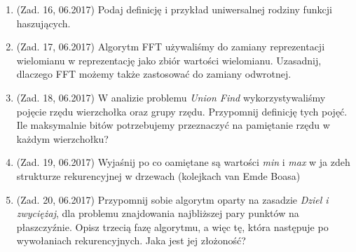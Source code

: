 \documentclass[10pt]{article}%
\begin{document}
\begin{enumerate}
\item (Zad. 16, 06.2017) Podaj definicję i przykład uniwersalnej rodziny funkcji haszujących.

\item (Zad. 17, 06.2017) Algorytm FFT używaliśmy do zamiany reprezentacji wielomianu w reprezentację jako zbiór wartości wielomianu. Uzasadnij, dlaczego FFT możemy także zastosować do zamiany odwrotnej.

\item (Zad. 18, 06.2017) W analizie problemu \emph{Union Find} wykorzystywaliśmy pojęcie rzędu wierzchołka oraz grupy rzędu. Przypomnij definicję tych pojęć. Ile maksymalnie bitów potrzebujemy przeznaczyć na pamiętanie rzędu w każdym wierzchołku?

\item (Zad. 19, 06.2017) Wyjaśnij po co oamiętane są wartości \emph{min} i \emph{max} w ja zdeh strukturze rekurencyjnej w drzewach (kolejkach van Emde Boasa)

\item (Zad. 20, 06.2017) Przypomnij sobie algorytm oparty na zasadzie \emph{Dziel i zwyciężaj}, dla problemu znajdowania najbliższej pary punktów na płaszczyźnie. Opisz trzecią fazę algorytmu, a więc tę, która następuje po wywołaniach rekurencyjnych. Jaka jest jej złożoność?


\end{enumerate}
\end{document}
